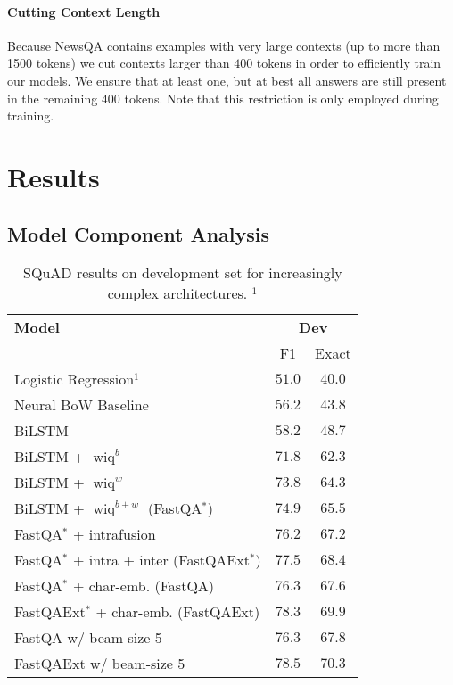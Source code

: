 \documentclass[11pt,a4paper]{article}
\begin{document}
\paragraph{Cutting Context Length}

Because NewsQA contains examples with very large contexts (up to more than 1500 tokens) we cut contexts larger than $400$ tokens in order to efficiently train our models. We ensure that at least one, but at best all answers are still present in the remaining $400$ tokens. Note that this restriction is only employed during training.

\section{Results}


\subsection{Model Component Analysis}

\begin{table}[h]
    \centering
    \small
    \begin{tabular}{l c c}
        \toprule
        \textbf{Model} & \multicolumn{2}{c}{\textbf{Dev}} \\
        & F1 & Exact \\
        \midrule
        Logistic Regression$^1$ & $51.0$ & $40.0$  \\
        \midrule
        Neural BoW Baseline & $56.2$ & $43.8$ \\
        \midrule
        BiLSTM & $58.2$ & $48.7$ \\
        BiLSTM + $\operatorname{wiq}^b$ & $71.8$ & $62.3$ \\
        BiLSTM + $\operatorname{wiq}^w$ & $73.8$ & $64.3$ \\
        BiLSTM + $\operatorname{wiq}^{b+w}$ (FastQA$^*$) & $74.9$ & $65.5$ \\
        \midrule
        FastQA$^*$ + intrafusion & $76.2$ & $67.2$ \\
        FastQA$^*$ + intra + inter (FastQAExt$^*$) & $77.5$ & $68.4$ \\
        \midrule
        FastQA$^*$ + char-emb. (FastQA) & $76.3$ & $67.6$ \\
        FastQAExt$^*$ + char-emb. (FastQAExt) & $78.3$ & $69.9$ \\
        \midrule
        FastQA w/ beam-size 5 & $76.3$ & $67.8$ \\
        FastQAExt w/ beam-size 5 & $\mathbf{78.5}$ & $\mathbf{70.3}$ \\
        \bottomrule
    \end{tabular}
    \caption{SQuAD results on development set for increasingly complex architectures. $^1$}
    \label{tab:squad_dev_results}
\end{table}
\end{document}
